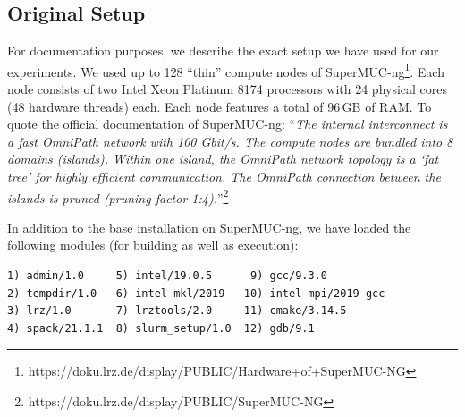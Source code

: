 \documentclass[runningheads]{article}
\numberwithin{dummy}{subsection}
\begin{document}
\subsection{Original Setup}
\label{sec:original-setup}

For documentation purposes, we describe the exact setup we have used for our experiments.
We used up to 128 ``thin'' compute nodes of SuperMUC-ng\footnote{https://doku.lrz.de/display/PUBLIC/Hardware+of+SuperMUC-NG}.
Each node consists of two Intel Xeon Platinum 8174 processors with 24 physical cores (48 hardware threads) each.
Each node features a total of 96\,GB of RAM.
To quote the official documentation of SuperMUC-ng: ``\textit{The internal interconnect is a fast OmniPath network with 100 Gbit/s.
The compute nodes are bundled into 8 domains (islands). Within one island, the OmniPath network topology is a `fat tree' for highly efficient communication. The OmniPath connection between the islands is pruned (pruning factor 1:4).}''\footnote{https://doku.lrz.de/display/PUBLIC/SuperMUC-NG}

In addition to the base installation on SuperMUC-ng, we have loaded the following modules (for building as well as execution):
{
\begin{verbatim}
1) admin/1.0     5) intel/19.0.5      9) gcc/9.3.0           
2) tempdir/1.0   6) intel-mkl/2019   10) intel-mpi/2019-gcc  
3) lrz/1.0       7) lrztools/2.0     11) cmake/3.14.5        
4) spack/21.1.1  8) slurm_setup/1.0  12) gdb/9.1    
\end{verbatim}
}
\end{document}
